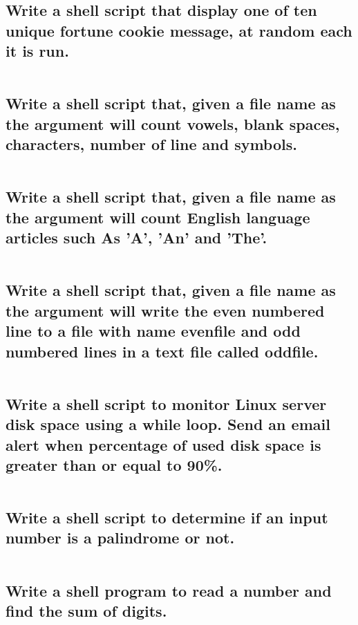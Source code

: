 \inputminted[breaklines, linenos]{shell}{25-09-2020/16.sh}
\subsection{
Write a shell script that display one of ten unique fortune cookie message, at random each it is run.
}

\inputminted[breaklines, linenos]{shell}{25-09-2020/17.sh}
\subsection{
Write a shell script that, given a file name as the argument will count vowels, blank spaces, characters, number of line and symbols.
}

\inputminted[breaklines, linenos]{shell}{25-09-2020/18.sh}
\subsection{
Write a shell script that, given a file name as the argument will count English language articles such As 'A', 'An' and 'The'.
}

\inputminted[breaklines, linenos]{shell}{25-09-2020/19.sh}
\subsection{
Write a shell script that, given a file name as the argument will write the even numbered line to a file with name evenfile and odd numbered lines in a text file called oddfile.
}

\inputminted[breaklines, linenos]{shell}{25-09-2020/20.sh}
\subsection{
Write a shell script to monitor Linux server disk space using a while loop. Send an email alert when percentage of used disk space is greater than or equal to 90\%.
}

\inputminted[breaklines, linenos]{shell}{25-09-2020/21.sh}
\subsection{
Write a shell script to determine if an input number is a palindrome or not.}

\inputminted[breaklines, linenos]{shell}{25-09-2020/22.sh}
\subsection{
Write a shell program to read a number and find the sum of digits.
}

